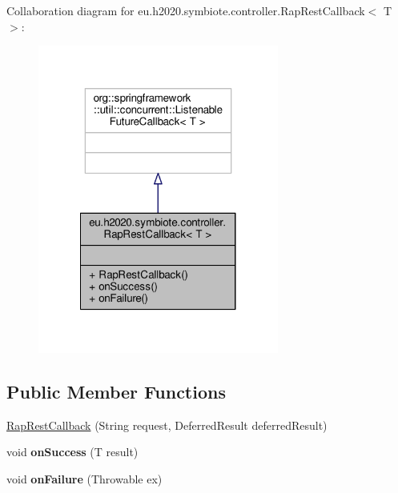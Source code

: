 Collaboration diagram for eu.\+h2020.\+symbiote.\+controller.\+Rap\+Rest\+Callback$<$ T $>$\+:\nopagebreak
\begin{figure}[H]
\begin{center}
\leavevmode
\includegraphics[width=224pt]{classeu_1_1h2020_1_1symbiote_1_1controller_1_1RapRestCallback__coll__graph}
\end{center}
\end{figure}
\subsection*{Public Member Functions}
\begin{DoxyCompactItemize}
\item 
\hyperlink{classeu_1_1h2020_1_1symbiote_1_1controller_1_1RapRestCallback_a86d21f4cafc340a56c2c398fde646ffc}{Rap\+Rest\+Callback} (String request, Deferred\+Result deferred\+Result)
\item 
\mbox{\label{classeu_1_1h2020_1_1symbiote_1_1controller_1_1RapRestCallback_a3b7d95cf0854add6e202f0cc9a4e481a}} 
void {\bfseries on\+Success} (T result)
\item 
\mbox{\label{classeu_1_1h2020_1_1symbiote_1_1controller_1_1RapRestCallback_a240e16518b44359ee628e5e6970c9898}} 
void {\bfseries on\+Failure} (Throwable ex)
\end{DoxyCompactItemize}


